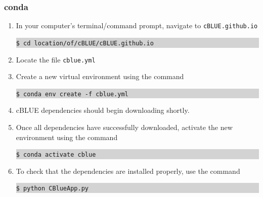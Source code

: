 \documentclass[11pt, a4paper]{article}
\begin{document}
\subsubsection{conda}
\begin{enumerate}
    \item In your computer's terminal/command prompt, navigate to \texttt{cBLUE.github.io}
    \colorbox{lightgray}{\begin{minipage}{\linewidth}
          \texttt{\$ cd location/of/cBLUE/cBLUE.github.io}
    \end{minipage}}
    \vspace{1em}
    \item Locate the file \texttt{cblue.yml}
    \vspace{1em}
    \item Create a new virtual environment using the command
    \colorbox{lightgray}{\begin{minipage}{\linewidth}
          \texttt{\$ conda env create -f cblue.yml}
    \end{minipage}}
    \vspace{1em}
    \item cBLUE dependencies should begin downloading shortly.
    \vspace{1em}
    \item Once all dependencies have successfully downloaded, activate the new environment using the command
    \colorbox{lightgray}{\begin{minipage}{\linewidth}
        \texttt{\$ conda activate cblue}
    \end{minipage}}
    \vspace{1em}
    \item To check that the dependencies are installed properly, use the command
    \colorbox{lightgray}{\begin{minipage}{\linewidth}
        \texttt{\$ python CBlueApp.py}
    \end{minipage}}
\end{enumerate}
\end{document}
